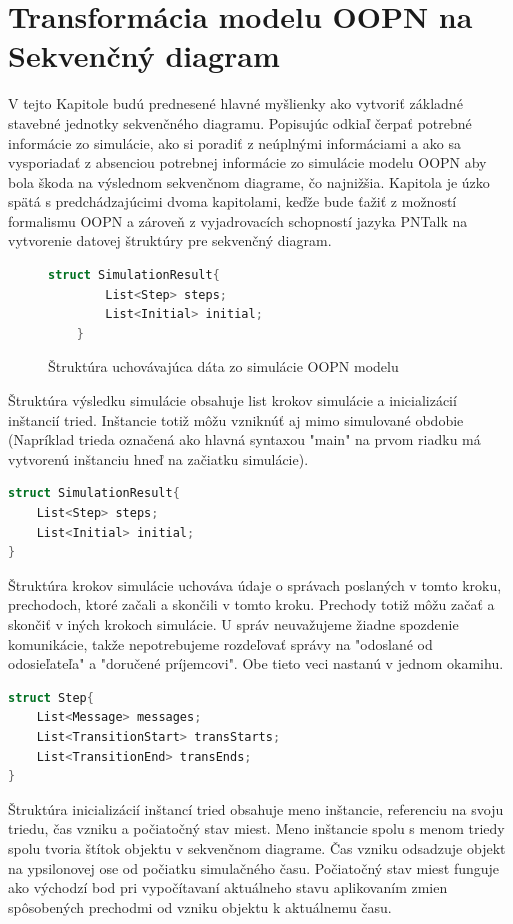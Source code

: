 \section{Transformácia modelu OOPN na Sekvenčný diagram}

V tejto Kapitole budú prednesené hlavné myšlienky ako vytvoriť základné stavebné jednotky sekvenčného diagramu. Popisujúc odkiaľ čerpať potrebné informácie zo simulácie, ako si poradiť z neúplnými informáciami a ako sa vysporiadať z absenciou potrebnej informácie zo simulácie modelu OOPN aby bola škoda na výslednom sekvenčnom diagrame, čo najnižšia. Kapitola je úzko spätá s predchádzajúcimi dvoma kapitolami, keďže bude ťažiť z možností formalismu OOPN a zároveň z vyjadrovacích schopností jazyka PNTalk na vytvorenie datovej štruktúry pre sekvenčný diagram.

\begin{figure} [H]
	\begin{lstlisting}[language=C++]
	struct SimulationResult{
		List<Step> steps;
		List<Initial> initial;
	}
	\end{lstlisting}
	\caption{Štruktúra uchovávajúca dáta zo simulácie OOPN modelu}
\end{figure}

Štruktúra výsledku simulácie obsahuje list krokov simulácie a inicializácií inštancií tried. Inštancie totiž môžu vzniknúť aj mimo simulované obdobie (Napríklad trieda označená ako hlavná syntaxou "main" na prvom riadku má vytvorenú inštanciu hneď na začiatku simulácie).

\begin{lstlisting}[language=C++]
struct SimulationResult{
	List<Step> steps;
	List<Initial> initial;
}
\end{lstlisting}

Štruktúra krokov simulácie uchováva údaje o správach poslaných v tomto kroku, prechodoch, ktoré začali a skončili v tomto kroku. Prechody totiž môžu začať a skončiť v iných krokoch simulácie. U správ neuvažujeme žiadne spozdenie komunikácie, takže nepotrebujeme rozdeľovať správy na "odoslané od odosieľateľa" a "doručené príjemcovi". Obe tieto veci nastanú v jednom okamihu.

\begin{lstlisting}[language=C++]
struct Step{
	List<Message> messages;
	List<TransitionStart> transStarts;
	List<TransitionEnd> transEnds;
}
\end{lstlisting}

Štruktúra inicializácií inštancí tried obsahuje meno inštancie, referenciu na svoju triedu, čas vzniku a počiatočný stav miest.
Meno inštancie spolu s menom triedy spolu tvoria štítok objektu v sekvenčnom diagrame. Čas vzniku odsadzuje objekt na ypsilonovej ose od počiatku simulačného času. Počiatočný stav miest funguje ako východzí bod pri vypočítavaní aktuálneho stavu aplikovaním zmien spôsobených prechodmi od vzniku objektu k aktuálnemu času.


